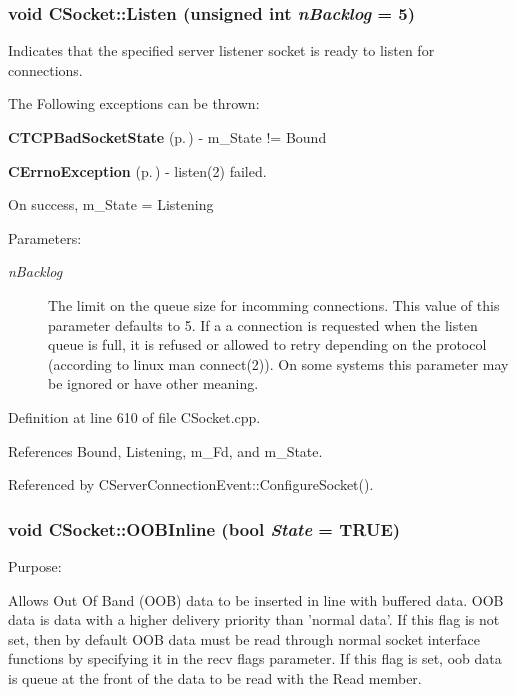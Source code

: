 \subsubsection{\setlength{\rightskip}{0pt plus 5cm}void CSocket::Listen (unsigned int {\em n\-Backlog} = 5)}\label{classCSocket_a8}


Indicates that the specified server  listener socket is ready to listen for connections.

The Following exceptions can be  thrown:

\begin{CompactItemize}
\item 
{\bf CTCPBad\-Socket\-State} {\rm (p.\,\pageref{classCTCPBadSocketState})} - m\_\-State != Bound\item 
{\bf CErrno\-Exception} {\rm (p.\,\pageref{classCErrnoException})} - listen(2) failed.\end{CompactItemize}
On success, m\_\-State = Listening\begin{Desc}
\item[Parameters: ]\par
\begin{description}
\item[{\em 
n\-Backlog}]The limit on the queue size for incomming connections.  This value of this parameter defaults to 5. If a a connection is requested when the listen queue is full, it is refused or allowed to retry depending on the protocol (according to linux man connect(2)). On some systems this parameter may be ignored or have other meaning. \end{description}
\end{Desc}


Definition at line 610 of file CSocket.cpp.

References Bound, Listening, m\_\-Fd, and m\_\-State.

Referenced by CServer\-Connection\-Event::Configure\-Socket().
\subsubsection{\setlength{\rightskip}{0pt plus 5cm}void CSocket::OOBInline (bool {\em State} = TRUE)}\label{classCSocket_a14}


Purpose:

Allows Out Of Band (OOB) data to be inserted in line with buffered data. OOB data is data with a higher delivery priority than 'normal data'. If this flag is not set, then by default OOB data must be read through normal socket interface functions by specifying it in the recv flags parameter. If this flag is set, oob data is queue at the front of the data to be read with the Read member.

